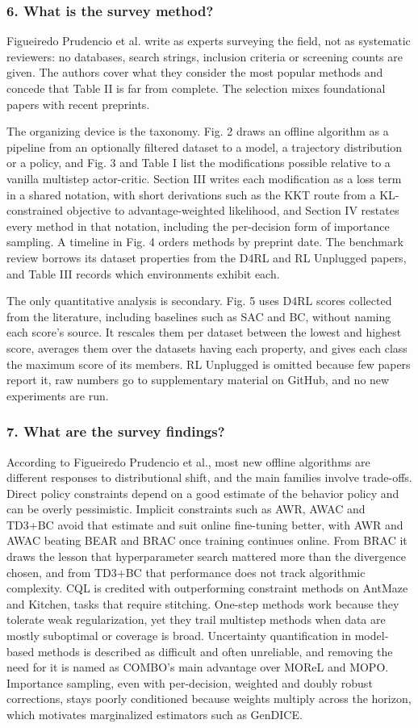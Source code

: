 \documentclass[11pt]{article}
\newcommand{\question}[1]{\subsubsection*{#1}}
\begin{document}
\question{6. What is the survey method?}

Figueiredo Prudencio et al. write as experts surveying the field, not as systematic reviewers: no databases, search strings, inclusion criteria or screening counts are given. The authors cover what they consider the most popular methods and concede that Table II is far from complete. The selection mixes foundational papers with recent preprints.

The organizing device is the taxonomy. Fig. 2 draws an offline algorithm as a pipeline from an optionally filtered dataset to a model, a trajectory distribution or a policy, and Fig. 3 and Table I list the modifications possible relative to a vanilla multistep actor-critic. Section III writes each modification as a loss term in a shared notation, with short derivations such as the KKT route from a KL-constrained objective to advantage-weighted likelihood, and Section IV restates every method in that notation, including the per-decision form of importance sampling. A timeline in Fig. 4 orders methods by preprint date. The benchmark review borrows its dataset properties from the D4RL and RL Unplugged papers, and Table III records which environments exhibit each.

The only quantitative analysis is secondary. Fig. 5 uses D4RL scores collected from the literature, including baselines such as SAC and BC, without naming each score's source. It rescales them per dataset between the lowest and highest score, averages them over the datasets having each property, and gives each class the maximum score of its members. RL Unplugged is omitted because few papers report it, raw numbers go to supplementary material on GitHub, and no new experiments are run.

\question{7. What are the survey findings?}

According to Figueiredo Prudencio et al., most new offline algorithms are different responses to distributional shift, and the main families involve trade-offs. Direct policy constraints depend on a good estimate of the behavior policy and can be overly pessimistic. Implicit constraints such as AWR, AWAC and TD3+BC avoid that estimate and suit online fine-tuning better, with AWR and AWAC beating BEAR and BRAC once training continues online. From BRAC it draws the lesson that hyperparameter search mattered more than the divergence chosen, and from TD3+BC that performance does not track algorithmic complexity. CQL is credited with outperforming constraint methods on AntMaze and Kitchen, tasks that require stitching. One-step methods work because they tolerate weak regularization, yet they trail multistep methods when data are mostly suboptimal or coverage is broad. Uncertainty quantification in model-based methods is described as difficult and often unreliable, and removing the need for it is named as COMBO's main advantage over MOReL and MOPO. Importance sampling, even with per-decision, weighted and doubly robust corrections, stays poorly conditioned because weights multiply across the horizon, which motivates marginalized estimators such as GenDICE.
\end{document}
